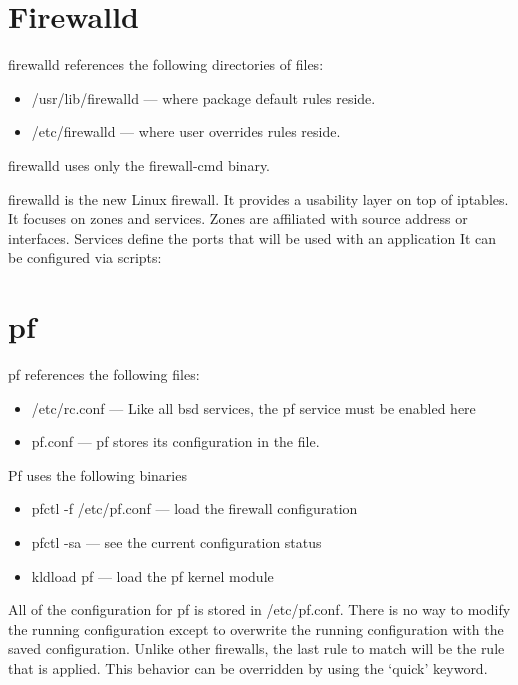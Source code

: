 
\section{Firewalld}
firewalld references the following directories of files:

\begin{itemize}
	\item /usr/lib/firewalld --- where package default rules reside.
	\item /etc/firewalld --- where user overrides rules reside.
\end{itemize}

firewalld uses only the firewall-cmd binary.

firewalld is the new Linux firewall.
It provides a usability layer on top of iptables.
It focuses on zones and services.
Zones are affiliated with source address or interfaces.
Services define the ports that will be used with an application
It can be configured via scripts:


\section{pf}

pf references the following files:
\begin{itemize}
	\item /etc/rc.conf --- Like all bsd services, the pf service must be enabled here
	\item pf.conf  --- pf stores its configuration in the file.
\end{itemize}

Pf uses the following binaries
\begin{itemize}
	\item pfctl -f /etc/pf.conf --- load the firewall configuration
	\item pfctl -sa --- see the current configuration status
	\item kldload pf --- load the pf kernel module
\end{itemize}

All of the configuration for pf is stored in /etc/pf.conf.
There is no way to modify the running configuration except to overwrite the running
configuration with the saved configuration.
Unlike other firewalls, the last rule to match will be the rule that is applied.
This behavior can be overridden by using the `quick' keyword.


